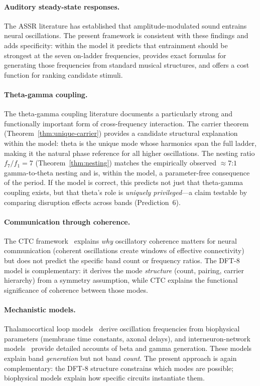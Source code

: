 \documentclass[11pt,a4paper]{article}
\begin{document}
\paragraph{Auditory steady-state responses.}
The ASSR literature \citep{galambos1981,picton2003,gao2014} has
established that amplitude-modulated sound entrains neural oscillations.
The present framework is consistent with these findings and adds
specificity: within the model it predicts that entrainment should be
strongest at the seven on-ladder frequencies, provides exact formulas
for generating those frequencies from standard musical structures, and
offers a cost function for ranking candidate stimuli.

\paragraph{Theta-gamma coupling.}
The theta-gamma coupling literature \citep{lisman2013,canolty2010}
documents a particularly strong and functionally important form of
cross-frequency interaction. The carrier theorem
(Theorem~\ref{thm:unique-carrier}) provides a candidate structural
explanation within the model: theta is the unique mode whose harmonics
span the full ladder, making it the natural phase reference for all
higher oscillations.
The nesting ratio $f_7/f_1 = 7$ (Theorem~\ref{thm:nesting}) matches
the empirically observed $\approx 7$:$1$ gamma-to-theta nesting and
is, within the model, a parameter-free consequence of the period.
If the model is correct, this predicts not just that theta-gamma
coupling exists, but that theta's role is \emph{uniquely
privileged}---a claim testable by comparing disruption effects across
bands (Prediction~6).

\paragraph{Communication through coherence.}
The CTC framework~\citep{fries2015} explains \emph{why} oscillatory
coherence matters for neural communication (coherent oscillations
create windows of effective connectivity) but does not predict the
specific band count or frequency ratios.  The DFT-8 model is
complementary: it derives the mode \emph{structure} (count, pairing,
carrier hierarchy) from a symmetry assumption, while CTC explains the
functional significance of coherence between those modes.

\paragraph{Mechanistic models.}
Thalamocortical loop models~\citep{lopes2010} derive oscillation
frequencies from biophysical parameters (membrane time constants,
axonal delays), and interneuron-network models~\citep{kopell2014}
provide detailed accounts of beta and gamma generation.
These models explain band \emph{generation} but not band
\emph{count}.  The present approach is again complementary: the DFT-8
structure constrains which modes are possible; biophysical models
explain how specific circuits instantiate them.
\end{document}
